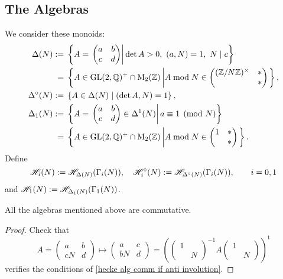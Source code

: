 \subsection{The Algebras}
We consider these monoids:
\begin{align*}
    \Delta(N) := {}& \left\{ A = \left.\begin{pmatrix}
        a&b\\c&d
    \end{pmatrix}\right|\det A > 0,\ (a, N) = 1,\ N\mid c \right\}\\
        ={} & \left\{ A\in\operatorname{GL}(2, \mathbb{Q})^+\cap \mathrm{M}_2(\mathbb{Z})\left| A\bmod N\in \begin{pmatrix}
            (\mathbb{Z}/N\mathbb{Z})^\times & * \\ & *
        \end{pmatrix}\right. \right\},
        \\
    \Delta^\circ(N) :={}& \left\{ A\in\Delta(N) \mid (\det A, N) = 1 \right\},\\
    \Delta_1(N) :={} &\left\{ A = \left.\begin{pmatrix}
        a&b\\c&d
    \end{pmatrix}\in\Delta^1(N)\right|a\equiv 1\pmod N \right\}\\
    ={}& \left\{ A\in\operatorname{GL}(2, \mathbb{Q})^+\cap \mathrm{M}_2(\mathbb{Z})\left| A\bmod N\in \begin{pmatrix}
        1 & * \\ & *
    \end{pmatrix}\right. \right\}.
\end{align*}
Define \[\mathscr{H}_i(N) := \mathscr{H}_{\Delta(N)}(\Gamma_i(N)),\quad \mathscr{H}_i^\circ(N) := \mathscr{H}_{\Delta^\circ(N)}(\Gamma_i(N)),\qquad i=0, 1\]
and $\mathscr{H}_1(N) := \mathscr{H}_{\Delta_1(N)}(\Gamma_1(N))$.

\begin{proposition}
    All the algebras mentioned above are commutative.
\end{proposition}
\begin{proof}
    Check that \[A = \begin{pmatrix}
        a & b \\ cN & d
    \end{pmatrix}\longmapsto
    \begin{pmatrix}
        a & c \\ bN & d
    \end{pmatrix} = \left( \begin{pmatrix}
        1 & \\ & N
    \end{pmatrix}^{-1} A \begin{pmatrix}
        1 & \\ & N
    \end{pmatrix} \right)^{\mathrm{t}} \]
    verifies the conditions of \cref{hecke alg comm if anti involution}.
\end{proof}

